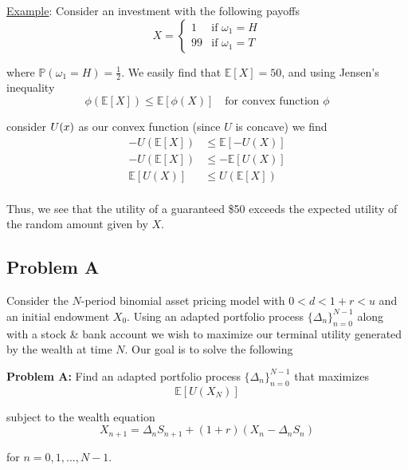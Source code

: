 \documentclass[12pt]{article}
\newlength\tindent
\renewcommand{\indent}{\hspace*{\tindent}}
\renewcommand{\P}{\mathbb P}
\newcommand{\E}{\mathbb E}
\begin{document}
\underline{Example}: Consider an investment with the following payoffs
\begin{equation*}
	X = 
	\begin{cases}
		1 & \text{if } \omega_1 = H \\
		99 & \text{if } \omega_1 = T
	\end{cases}
\end{equation*}

where $\P(\omega_1 = H) = \frac{1}{2}$. We easily find that $\E[X] = 50$, and using Jensen's inequality
\begin{equation*}
	\phi(\E[X]) \leq \E[\phi(X)] \quad \text{for convex function $\phi$}
\end{equation*}

consider $\-U(x)$ as our convex function (since $U$ is concave) we find
\begin{align*}
	-U(\E[X]) &\leq \E[-U(X)] \\
	-U(\E[X]) &\leq -\E[U(X)] \\
	\E[U(X)] &\leq U(\E[X]) \\
\end{align*}

\indent Thus, we see that the utility of a guaranteed \$50 exceeds the expected utility of the random amount given by $X$. 

\subsection{Problem A}

\indent Consider the $N$-period binomial asset pricing model with $0 < d< 1 + r < u$ and an initial endowment $X_0$. Using an adapted portfolio process $\{\Delta_n\}^{N - 1}_{n = 0}$ along with a stock \& bank account we wish to maximize our terminal utility generated by the wealth at time $N$. Our goal is to solve the following

\begin{framed}
{\bf Problem A:} Find an adapted portfolio process $\{\Delta_n\}^{N - 1}_{n = 0}$ that maximizes
\begin{equation*}
	\E[U(X_N)]
\end{equation*}

subject to the wealth equation
\begin{equation*}
	X_{n + 1} = \Delta_nS_{n + 1} + (1 + r)(X_n - \Delta_nS_n)
\end{equation*}

for $n = 0, 1,..., N - 1$.
\end{framed}
\end{document}
